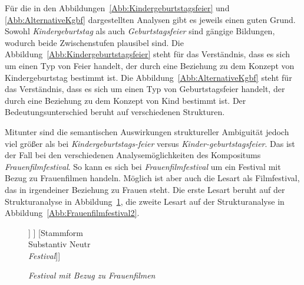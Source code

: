 Für die in den Abbildungen~\ref{Abb:Kindergeburtstagsfeier} und \ref{Abb:AlternativeKgbf} dargestellten Analysen gibt es jeweils einen guten Grund. Sowohl \textit{Kindergeburtstag} als auch \textit{Geburtstagsfeier} sind gängige Bildungen, wodurch beide Zwischenstufen plausibel sind. Die Abbildung~\ref{Abb:Kindergeburtstagsfeier} steht für das Verständnis, dass es sich um einen Typ von Feier handelt, der durch eine Beziehung zu dem Konzept von Kindergeburtstag bestimmt ist. Die Abbildung~\ref{Abb:AlternativeKgbf} steht für das Verständnis, dass es sich um einen Typ von Geburtstagsfeier handelt, der durch eine Beziehung zu dem Konzept von Kind bestimmt ist. Der Bedeutungsunterschied beruht auf verschiedenen Strukturen.

Mitunter sind die semantischen Auswirkungen struktureller Ambiguität jedoch viel größer als bei \textit{Kindergeburtstags-feier} versus \textit{Kinder-geburtstagsfeier}. Das ist der Fall bei den verschiedenen Analysemöglichkeiten des Kompositums \textit{Frauenfilmfestival}. So kann es sich bei \textit{Frauenfilmfestival} um ein Festival mit Bezug zu Frauenfilmen handeln. Möglich ist aber auch die Lesart als Filmfestival, das in irgendeiner Beziehung zu Frauen steht. Die erste Lesart beruht auf der Strukturanalyse in Abbildung~\ref{Abb:Frauenfilmfestival1}, die zweite Lesart auf der Strukturanalyse in Abbildung~\ref{Abb:Frauenfilmfestival2}.

	\begin{figure}
		\centering
	\begin{forest}
		[Stammform\\ Substantiv Neutr\\ \textit{Frauenfilmfestival} [Kompositionsstammform\\Substantiv Mask\\ \textit{frauenfilm} [Stammform\\ Substantiv Mask\\ \textit{Frauenfilm} [Kompositionsstammform\\Substantiv Fem \\ \textit{frauen}] [Stammform\\ Substantiv Mask\\ \textit{Film}]  ]   ] [Stammform\\Substantiv Neutr\\ \textit{Festival}]]
	\end{forest}
	\caption{\textit{Festival mit Bezug zu Frauenfilmen}}\label{Abb:Frauenfilmfestival1}
\end{figure}


